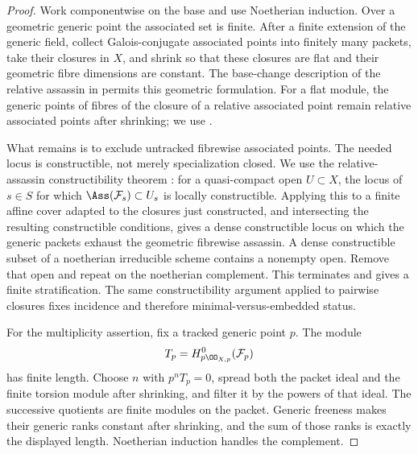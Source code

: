 \begin{proof}
Work componentwise on the base and use Noetherian induction.  Over a
geometric generic point the associated set is finite.  After a finite
extension of the generic field, collect Galois-conjugate associated
points into finitely many packets, take their closures in \(X\), and
shrink so that these closures are flat and their geometric fibre
dimensions are constant.  The base-change description of the relative
assassin in \cite[Tag 05AS]{StacksRelativeAssassin} permits this
geometric formulation.  For a flat module, the generic points of
fibres of the closure of a relative associated point remain relative
associated points after shrinking; we use
\cite[Tag 0GSJ]{StacksFlatRelativeAssassin}.

What remains is to exclude untracked fibrewise associated points.
The needed locus is constructible, not merely specialization closed.
We use the relative-assassin constructibility theorem
\cite[Tag 05KR]{StacksConstructibleAssassin}: for a quasi-compact open
\(U\subset X\), the locus of \(s\in S\) for which
\(\Ass(\mathcal F_s)\subset U_s\) is locally constructible.
Applying this to a finite affine cover adapted to the closures just
constructed, and intersecting the resulting constructible conditions,
gives a dense constructible locus on which the generic packets exhaust
the geometric fibrewise assassin.  A dense constructible subset of a
noetherian irreducible scheme contains a nonempty open.  Remove that
open and repeat on the noetherian complement.  This terminates and
gives a finite stratification.  The same constructibility argument
applied to pairwise closures fixes incidence and therefore
minimal-versus-embedded status.

For the multiplicity assertion, fix a tracked generic point \(p\).
The module
\[
 T_p=H^0_{p\OO_{X,p}}(\mathcal F_p)
\]
has finite length.  Choose \(n\) with \(p^nT_p=0\), spread both the
packet ideal and the finite torsion module after shrinking, and filter
it by the powers of that ideal.  The successive quotients are finite
modules on the packet.  Generic freeness makes their generic ranks
constant after shrinking, and the sum of those ranks is exactly the
displayed length.  Noetherian induction handles the complement.
\end{proof}

